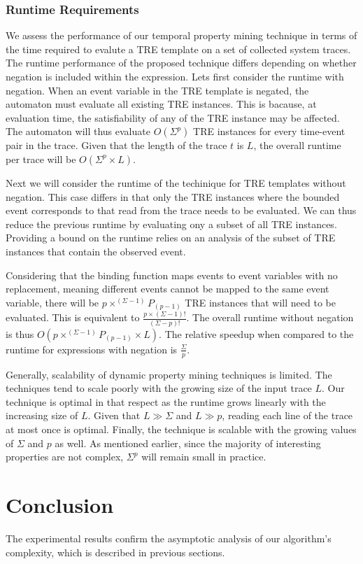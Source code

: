 \documentclass[]{sigplanconf}
\begin{document}
\subsubsection{Runtime Requirements}

We assess the performance of our temporal property mining technique in terms of the time required to evalute a TRE template on a set of collected system traces.
The runtime performance of the proposed technique differs depending on whether negation is included within the expression.
Lets first consider the runtime with negation. When an event variable in the TRE template is negated, the automaton must evaluate all existing TRE instances. This is bacause, at evaluation time, the satisfiability of any of the TRE instance may be affected. The automaton will thus evaluate $O(\Sigma^p)$ TRE instances for every time-event pair in the trace. Given that the length of the trace $t$ is $L$, the overall runtime per trace will be $O(\Sigma^p \times L)$.

Next we will consider the runtime of the techinique for TRE templates without negation. This case differs in that only the TRE instances where the bounded event corresponds to that read from the trace needs to be evaluated. We can thus reduce the previous runtime by evaluating ony a subset of all TRE instances. Providing a bound on the runtime relies on an analysis of the subset of TRE instances that contain the observed event.

Considering that the binding function maps events to event variables with no replacement, meaning different events cannot be mapped to the same event variable, there will be $p \times ^{(\Sigma - 1)}P_{(p - 1)}$ TRE instances that will need to be evaluated. This is equivalent to $\frac{p \times (\Sigma - 1)!}{(\Sigma - p)!}$. The overall runtime without negation is thus
$O(p \times ^{(\Sigma - 1)}P_{(p - 1)} \times L)$. The relative speedup when compared to the runtime for expressions with negation is $\frac{\Sigma}{p}$.


Generally, scalability of dynamic property mining techniques is limited.
The techniques tend to scale poorly with the growing size of the input trace $L$. Our technique is optimal in that respect as the runtime grows linearly with the increasing size of $L$. Given that $L \gg \Sigma$ and $L \gg p$, reading each line of the trace at most once is optimal.
Finally, the technique is scalable with the growing values of $\Sigma$ and $p$ as well. As mentioned earlier, since the majority of interesting properties are not complex, $\Sigma^p$ will remain small in practice.

\section{Conclusion}

The experimental results confirm the asymptotic analysis of our algorithm's complexity, which is described in previous sections.


%


\end{document}
